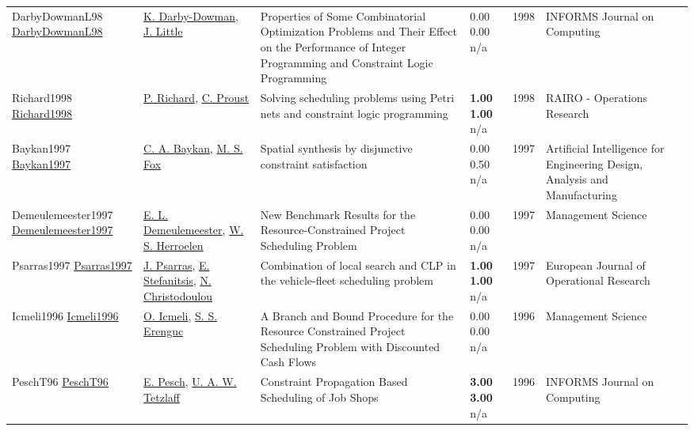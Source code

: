 {\begin{longtable}{p{3cm}p{5cm}p{10cm}p{1cm}rp{2.5cm}l}
DarbyDowmanL98 \href{http://dx.doi.org/10.1287/ijoc.10.3.276}{DarbyDowmanL98} & \hyperref[auth:a177]{K. Darby-Dowman}, \hyperref[auth:a178]{J. Little} & Properties of Some Combinatorial Optimization Problems and Their Effect on the Performance of Integer Programming and Constraint Logic Programming & \noindent{}\textcolor{black!50}{0.00} \textcolor{black!50}{0.00} n/a & 1998 & \cellcolor{red!20}INFORMS Journal on Computing & \cite{DarbyDowmanL98}\\
Richard1998 \href{http://dx.doi.org/10.1051/ro/1998320201251}{Richard1998} & \hyperref[auth:a1684]{P. Richard}, \hyperref[auth:a1685]{C. Proust} & \cellcolor{gold!20}Solving scheduling problems using Petri nets and constraint logic programming & \noindent{}\textbf{1.00} \textbf{1.00} n/a & 1998 & RAIRO - Operations Research & \cite{Richard1998}\\
Baykan1997 \href{http://dx.doi.org/10.1017/s0890060400003206}{Baykan1997} & \hyperref[auth:a1689]{C. A. Baykan}, \hyperref[auth:a302]{M. S. Fox} & \cellcolor{green!10}Spatial synthesis by disjunctive constraint satisfaction & \noindent{}\textcolor{black!50}{0.00} 0.50 n/a & 1997 & Artificial Intelligence for Engineering Design, Analysis and Manufacturing & \cite{Baykan1997}\\
Demeulemeester1997 \href{http://dx.doi.org/10.1287/mnsc.43.11.1485}{Demeulemeester1997} & \hyperref[auth:a1584]{E. L. Demeulemeester}, \hyperref[auth:a1585]{W. S. Herroelen} & \cellcolor{green!10}New Benchmark Results for the Resource-Constrained Project Scheduling Problem & \noindent{}\textcolor{black!50}{0.00} \textcolor{black!50}{0.00} n/a & 1997 & Management Science & \cite{Demeulemeester1997}\\
Psarras1997 \href{http://dx.doi.org/10.1016/s0377-2217(96)00114-2}{Psarras1997} & \hyperref[auth:a2040]{J. Psarras}, \hyperref[auth:a2041]{E. Stefanitsis}, \hyperref[auth:a2042]{N. Christodoulou} & Combination of local search and CLP in the vehicle-fleet scheduling problem & \noindent{}\textbf{1.00} \textbf{1.00} n/a & 1997 & European Journal of Operational Research & \cite{Psarras1997}\\
Icmeli1996 \href{http://dx.doi.org/10.1287/mnsc.42.10.1395}{Icmeli1996} & \hyperref[auth:a1553]{O. Icmeli}, \hyperref[auth:a1554]{S. S. Erenguc} & A Branch and Bound Procedure for the Resource Constrained Project Scheduling Problem with Discounted Cash Flows & \noindent{}\textcolor{black!50}{0.00} \textcolor{black!50}{0.00} n/a & 1996 & Management Science & \cite{Icmeli1996}\\
PeschT96 \href{http://dx.doi.org/10.1287/ijoc.8.2.144}{PeschT96} & \hyperref[auth:a438]{E. Pesch}, \hyperref[auth:a1216]{U. A. W. Tetzlaff} & Constraint Propagation Based Scheduling of Job Shops & \noindent{}\textbf{3.00} \textbf{3.00} n/a & 1996 & \cellcolor{red!20}INFORMS Journal on Computing & \cite{PeschT96}\\

\end{longtable}}
